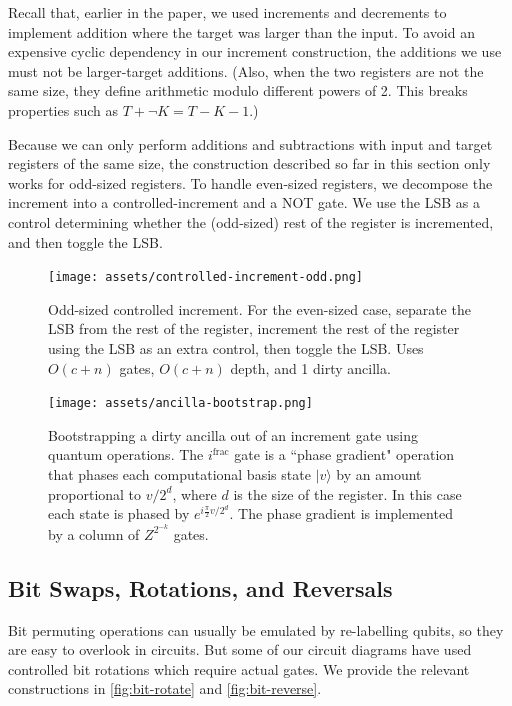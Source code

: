 \documentclass[twocolumn,longbibliography]{quantumarticle-customized}
\begin{document}
Recall that, earlier in the paper, we used increments and decrements to implement addition where the target was larger than the input.
To avoid an expensive cyclic dependency in our increment construction, the additions we use must not be larger-target additions.
(Also, when the two registers are not the same size, they define arithmetic modulo different powers of 2.
This breaks properties such as $T + \lnot K = T - K - 1$.)

Because we can only perform additions and subtractions with input and target registers of the same size, the construction described so far in this section only works for odd-sized registers.
To handle even-sized registers, we decompose the increment into a controlled-increment and a NOT gate.
We use the LSB as a control determining whether the (odd-sized) rest of the register is incremented, and then toggle the LSB.

\begin{figure}
  \centering
  \texttt{[image: assets/controlled-increment-odd.png]}
  \caption{
    Odd-sized controlled increment.
    For the even-sized case, separate the LSB from the rest of the register, increment the rest of the register using the LSB as an extra control, then toggle the LSB.
    Uses $O(c+n)$ gates, $O(c+n)$ depth, and 1 dirty ancilla.
  }
  \label{fig:controlled-increment-odd}
\end{figure}

\begin{figure}
  \centering
  \texttt{[image: assets/ancilla-bootstrap.png]}
  \caption{ Bootstrapping a dirty ancilla out of an increment gate using quantum operations.
  The $i^{\text{frac}}$ gate is a ``phase gradient" operation that phases each computational basis state $|v\rangle$ by an amount proportional to $v/2^d$, where $d$ is the size of the register.
  In this case each state is phased by $e^{i \frac{\pi}{2} v/2^d}$.
  The phase gradient is implemented by a column of $Z^{2^{-k}}$ gates.}
  \label{fig:bootstrap-ancilla}
\end{figure}


\subsection{Bit Swaps, Rotations, and Reversals}

Bit permuting operations can usually be emulated by re-labelling qubits, so they are easy to overlook in circuits.
But some of our circuit diagrams have used controlled bit rotations which require actual gates.
We provide the relevant constructions in \autoref{fig:bit-rotate} and \autoref{fig:bit-reverse}.
\end{document}
